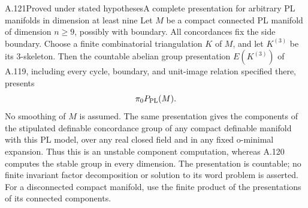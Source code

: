 \begin{saresult}{A.121}{Proved under stated hypotheses}{A complete presentation for arbitrary PL manifolds in dimension at least nine}
Let $M$ be a compact connected PL manifold of dimension $n\geq9$,
possibly with boundary. All concordances fix the side boundary.
Choose a finite combinatorial triangulation $K$ of $M$, and let
$K^{(3)}$ be its $3$-skeleton. Then the countable abelian group
presentation $E(K^{(3)})$ of A.119, including every cycle,
boundary, and unit-image relation specified there, presents
\[
             \pi_0 P_{\rm PL}(M).
\]
No smoothing of $M$ is assumed. The same presentation gives the
components of the stipulated definable concordance group of any
compact definable manifold with this PL model, over any real closed
field and in any fixed o-minimal expansion. Thus this is an unstable
component computation, whereas A.120 computes the stable group in
every dimension. The presentation is countable; no finite invariant
factor decomposition or solution to its word problem is asserted.
For a disconnected compact manifold, use the finite product of the
presentations of its connected components.
\end{saresult}
